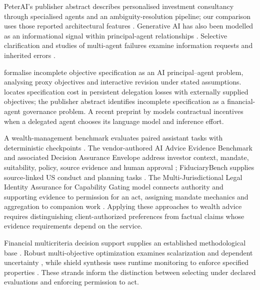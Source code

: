 \documentclass[oneside,10pt,english]{swissi}
\begin{document}
PeterAI's publisher abstract describes personalised investment consultancy through specialised agents and an ambiguity-resolution pipeline; our comparison uses those reported architectural features \parencite{gadioli2026peterai}. Generative AI has also been modelled as an informational signal within principal-agent relationships \parencite{zhang2025genai}. Selective clarification and studies of multi-agent failures examine information requests and inherited errors \parencite{kuhn2023clam,cemri2025fail,xie2026spark}.

\textcite{zhuang2020misaligned} formalise incomplete objective specification as an AI principal--agent problem, analysing proxy objectives and interactive revision under stated assumptions. \textcite{ante2026specification} locates specification cost in persistent delegation losses with externally supplied objectives; the publisher abstract identifies incomplete specification as a financial-agent governance problem. A recent preprint by \textcite{sreenivas2026contracting} models contractual incentives when a delegated agent chooses its language model and inference effort.

A wealth-management benchmark evaluates paired assistant tasks with deterministic checkpoints \parencite{milsom2025benchmark}. The vendor-authored AI Advice Evidence Benchmark and associated Decision Assurance Envelope address investor context, mandate, suitability, policy, source evidence and human approval \parencite{srivastava2026evidence,srivastava2026envelope}; FiduciaryBench supplies source-linked US conduct and planning tasks \parencite{wealthschema2026fiduciary}. The Multi-Jurisdictional Legal Identity Assurance for Capability Gating model connects authority and supporting evidence to permission for an act, assigning mandate mechanics and aggregation to companion work \parencite{kurz2026identity}. Applying these approaches to wealth advice requires distinguishing client-authorized preferences from factual claims whose evidence requirements depend on the service.

Financial multicriteria decision support supplies an established methodological base \parencite{steuer2003finance}. Robust multi-objective optimization examines scalarization and dependent uncertainty \parencite{bokrantz2017robust}, while shield synthesis uses runtime monitoring to enforce specified properties \parencite{bloem2015shield}. These strands inform the distinction between selecting under declared evaluations and enforcing permission to act.
\end{document}
